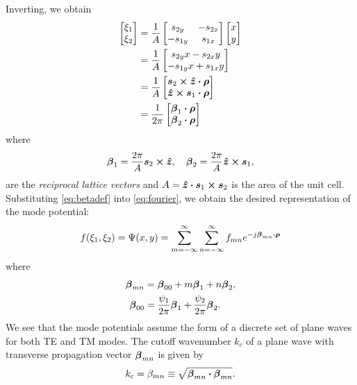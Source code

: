 Inverting, we obtain
\begin{align}
\begin{bmatrix} \xi_1 \\ \xi_2 \end{bmatrix} &=
  \frac{1}{A}
  \begin{bmatrix}
    s_{2y} & -s_{2x} \\
    -s_{1y} & s_{1x} 
  \end{bmatrix}
      \begin{bmatrix} x\\y \end{bmatrix} \nonumber \\
      &=
      \frac{1}{A}
      \begin{bmatrix} s_{2y}x -s_{2x}y \\
        -s_{1y}x + s_{1x}y \end{bmatrix}  \nonumber \\
      &=
      \frac{1}{A}
      \begin{bmatrix} \boldsymbol{s}_2 \boldsymbol{\times} \boldsymbol{\hat{z}} \boldsymbol{\cdot} \boldsymbol{\rho} \\
        \boldsymbol{\hat{z}} \boldsymbol{\times} \boldsymbol{s}_1 \boldsymbol{\cdot} \boldsymbol{\rho} \end{bmatrix}  \nonumber \\
      &=
      \frac{1}{2\pi}
      \begin{bmatrix} 
        \boldsymbol{\beta}_1 \boldsymbol{\cdot} \boldsymbol{\rho} \\
        \boldsymbol{\beta}_2 \boldsymbol{\cdot} \boldsymbol{\rho}
         \end{bmatrix}
\end{align}
where 
\begin{equation}
  \label{eq:betadef}
  \boldsymbol{\beta}_1 = \frac{2\pi}{A} \boldsymbol{s}_2\boldsymbol{\times}\boldsymbol{\hat{z}}, \quad
  \boldsymbol{\beta}_2 = \frac{2\pi}{A} \boldsymbol{\hat{z}} \boldsymbol{\times} \boldsymbol{s}_1,
\end{equation}
are the {\em reciprocal lattice vectors} \cite{dufo:67,kitt:66}
and $A = \boldsymbol{\hat{z}} \boldsymbol{\cdot} \boldsymbol{s}_1 \boldsymbol{\times} \boldsymbol{s}_2$ is the area of the unit cell.
Substituting \eqref{eq:betadef} into \eqref{eq:fourier}, we obtain the
desired representation of the mode potential:
\begin{equation}
    f(\xi_1,\xi_2) = \Psi(x,y) = 
  \sum_{m=-\infty}^{\infty} \sum_{n=-\infty}^{\infty}
  f_{mn} e^{-j\boldsymbol{\beta}_{mn} \boldsymbol{\cdot} \boldsymbol{\rho}}
\end{equation}
where 
\begin{subequations}
  \begin{align}
    \boldsymbol{\beta}_{mn} &= \boldsymbol{\beta}_{00} + m\boldsymbol{\beta}_1 + n\boldsymbol{\beta}_2, \\
    \boldsymbol{\beta}_{00} &= \frac{\psi_1}{2\pi}\boldsymbol{\beta}_1 +  \frac{\psi_2}{2\pi}\boldsymbol{\beta}_2. 
  \end{align}
\end{subequations}
We see that the mode potentials assume the form of a discrete set of plane waves for
both TE and TM modes.  The cutoff wavenumber $k_c$ of a plane wave
with transverse propagation vector $\boldsymbol{\beta}_{mn}$ is given by 
\begin{equation}
  k_c = \beta_{mn} \equiv \sqrt{\boldsymbol{\beta}_{mn} \boldsymbol{\cdot} \boldsymbol{\beta}_{mn}}.
\end{equation}
